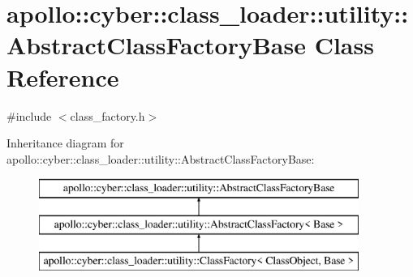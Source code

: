 \hypertarget{classapollo_1_1cyber_1_1class__loader_1_1utility_1_1AbstractClassFactoryBase}{\section{apollo\-:\-:cyber\-:\-:class\-\_\-loader\-:\-:utility\-:\-:Abstract\-Class\-Factory\-Base Class Reference}
\label{classapollo_1_1cyber_1_1class__loader_1_1utility_1_1AbstractClassFactoryBase}
}


{\ttfamily \#include $<$class\-\_\-factory.\-h$>$}

Inheritance diagram for apollo\-:\-:cyber\-:\-:class\-\_\-loader\-:\-:utility\-:\-:Abstract\-Class\-Factory\-Base\-:\begin{figure}[H]
\begin{center}
\leavevmode
\includegraphics[height=3.000000cm]{classapollo_1_1cyber_1_1class__loader_1_1utility_1_1AbstractClassFactoryBase}
\end{center}
\end{figure}
